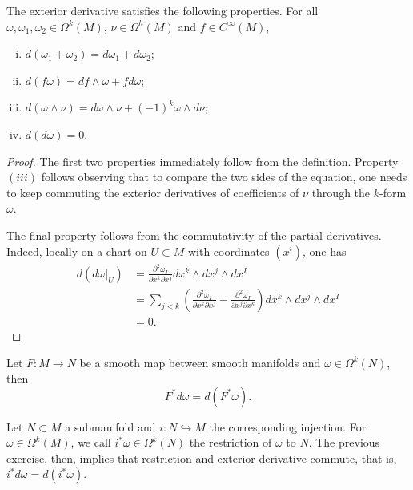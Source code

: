 \begin{lemma}
  The exterior derivative satisfies the following properties.
  For all $\omega,\omega_1,\omega_2\in\Omega^k(M)$, $\nu\in\Omega^h(M)$ and $f\in C^\infty(M)$,
  \begin{enumerate}[(i)]
    \item $d(\omega_1 + \omega_2) = d\omega_1 + d\omega_2$;
    \item $d(f\omega) = df\wedge \omega + f d\omega$;
    \item $d(\omega\wedge\nu) = d\omega\wedge \nu + (-1)^k \omega\wedge d\nu$;
    \item $d(d\omega) = 0$.
  \end{enumerate}
\end{lemma}
\begin{proof}
  The first two properties immediately follow from the definition.
  Property $(iii)$ follows observing that to compare the two sides of the equation, one needs to keep commuting the exterior derivatives of coefficients of $\nu$ through the $k$-form $\omega$.

  The final property follows from the commutativity of the partial derivatives. Indeed, locally on a chart on $U\subset M$ with coordinates $(x^i)$, one has
  \begin{align}
    d(d\omega|_U) &= \frac{\partial^2 \omega_I}{\partial x^k\partial x^j} dx^k\wedge dx^j \wedge dx^I \\
    &= \sum_{j<k} \left(\frac{\partial^2 \omega_I}{\partial x^k\partial x^j}  - \frac{\partial^2 \omega_I}{\partial x^j\partial x^k}\right)dx^k\wedge dx^j \wedge dx^I \\
    &= 0.
  \end{align}
\end{proof}

\begin{exercise}\label{ex:smoothpushforward}
  Let $F:M\to N$ be a smooth map between smooth manifolds and $\omega\in\Omega^k(N)$, then
  \begin{equation}
    F^* d\omega = d(F^* \omega).
  \end{equation}
\end{exercise}

Let $N\subset M$ a submanifold and $i:N\hookrightarrow M$ the corresponding injection.
For $\omega\in\Omega^k(M)$, we call $i^*\omega \in \Omega^k(N)$ the restriction of $\omega$ to $N$.
The previous exercise, then, implies that restriction and exterior derivative commute, that is, $i^*d\omega = d(i^*\omega)$.

